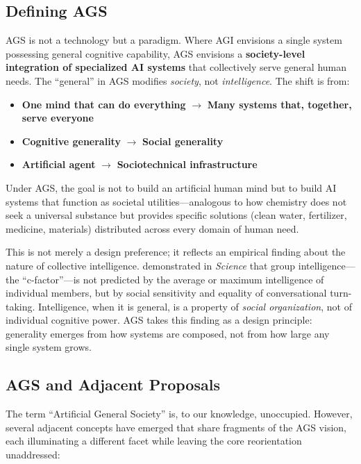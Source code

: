 \documentclass[12pt]{article}
\begin{document}
\subsection{Defining AGS}
\label{sec:definingags}

AGS is not a technology but a paradigm. Where AGI envisions a single system possessing general cognitive capability, AGS envisions a \textbf{society-level integration of specialized AI systems} that collectively serve general human needs. The ``general'' in AGS modifies \emph{society}, not \emph{intelligence}. The shift is from:

\begin{itemize}
  \item \textbf{One mind that can do everything} $\rightarrow$ \textbf{Many systems that, together, serve everyone}
  \item \textbf{Cognitive generality} $\rightarrow$ \textbf{Social generality}
  \item \textbf{Artificial agent} $\rightarrow$ \textbf{Sociotechnical infrastructure}
\end{itemize}

Under AGS, the goal is not to build an artificial human mind but to build AI systems that function as societal utilities---analogous to how chemistry does not seek a universal substance but provides specific solutions (clean water, fertilizer, medicine, materials) distributed across every domain of human need.

This is not merely a design preference; it reflects an empirical finding about the nature of collective intelligence. \citet{woolley2010} demonstrated in \emph{Science} that group intelligence---the ``c-factor''---is not predicted by the average or maximum intelligence of individual members, but by social sensitivity and equality of conversational turn-taking. Intelligence, when it is general, is a property of \emph{social organization}, not of individual cognitive power. AGS takes this finding as a design principle: generality emerges from how systems are composed, not from how large any single system grows.

\subsection{AGS and Adjacent Proposals}
\label{sec:adjacent}

The term ``Artificial General Society'' is, to our knowledge, unoccupied. However, several adjacent concepts have emerged that share fragments of the AGS vision, each illuminating a different facet while leaving the core reorientation unaddressed:
\end{document}
